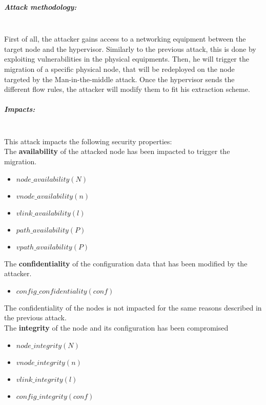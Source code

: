 \subparagraph{Attack methodology:}\textbf{\\}
First of all, the attacker gains access to a networking equipment between the target node and the hypervisor. Similarly to the previous attack, this is done by exploiting vulnerabilities in the physical equipments.
Then, he will trigger the migration of a specific physical node, that will be redeployed on the node targeted by the Man-in-the-middle attack.
Once the hypervisor sends the different flow rules, the attacker will modify them to fit his extraction scheme.

\subparagraph{Impacts:}\textbf{\\}
This attack impacts the following security properties:\\
The \textbf{availability} of the attacked node has been impacted to trigger the migration.
\begin{itemize}
    \item $node\_availability(N)$
    \item $vnode\_availability(n)$
    \item $vlink\_availability(l)$
    \item $path\_availability(P)$
    \item $vpath\_availability(P)$
\end{itemize}
The \textbf{confidentiality} of the configuration data that has been modified by the attacker.
\begin{itemize}
    \item $config\_confidentiality(conf)$
\end{itemize}
The confidentiality of the nodes is not impacted for the same reasons described in the previous attack.\\
The \textbf{integrity} of the node and its configuration has been compromised
    \begin{itemize}
    \item $node\_integrity(N)$
    \item $vnode\_integrity(n)$
    \item $vlink\_integrity(l)$
    \item $config\_integrity(conf)$
\end{itemize}


